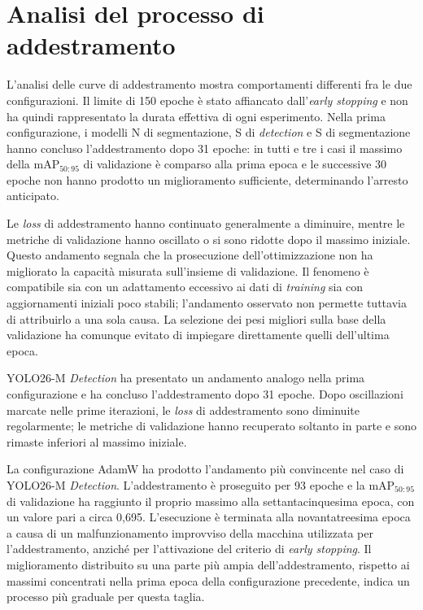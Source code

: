 \section{Analisi del processo di addestramento}

L'analisi delle curve di addestramento mostra comportamenti differenti fra le due configurazioni. Il limite di 150 epoche è stato affiancato dall'\textit{early stopping} e non ha quindi rappresentato la durata effettiva di ogni esperimento. Nella prima configurazione, i modelli N di segmentazione, S di \textit{detection} e S di segmentazione hanno concluso l'addestramento dopo 31 epoche: in tutti e tre i casi il massimo della $\mathrm{mAP}_{50:95}$ di validazione è comparso alla prima epoca e le successive 30 epoche non hanno prodotto un miglioramento sufficiente, determinando l'arresto anticipato.

Le \textit{loss} di addestramento hanno continuato generalmente a diminuire, mentre le metriche di validazione hanno oscillato o si sono ridotte dopo il massimo iniziale. Questo andamento segnala che la prosecuzione dell'ottimizzazione non ha migliorato la capacità misurata sull'insieme di validazione. Il fenomeno è compatibile sia con un adattamento eccessivo ai dati di \textit{training} sia con aggiornamenti iniziali poco stabili; l'andamento osservato non permette tuttavia di attribuirlo a una sola causa. La selezione dei pesi migliori sulla base della validazione ha comunque evitato di impiegare direttamente quelli dell'ultima epoca.

YOLO26-M \textit{Detection} ha presentato un andamento analogo nella prima configurazione e ha concluso l'addestramento dopo 31 epoche. Dopo oscillazioni marcate nelle prime iterazioni, le \textit{loss} di addestramento sono diminuite regolarmente; le metriche di validazione hanno recuperato soltanto in parte e sono rimaste inferiori al massimo iniziale.

La configurazione AdamW ha prodotto l'andamento più convincente nel caso di YOLO26-M \textit{Detection}. L'addestramento è proseguito per 93 epoche e la $\mathrm{mAP}_{50:95}$ di validazione ha raggiunto il proprio massimo alla settantacinquesima epoca, con un valore pari a circa 0{,}695. L'esecuzione è terminata alla novantatreesima epoca a causa di un malfunzionamento improvviso della macchina utilizzata per l'addestramento, anziché per l'attivazione del criterio di \textit{early stopping}. Il miglioramento distribuito su una parte più ampia dell'addestramento, rispetto ai massimi concentrati nella prima epoca della configurazione precedente, indica un processo più graduale per questa taglia.

